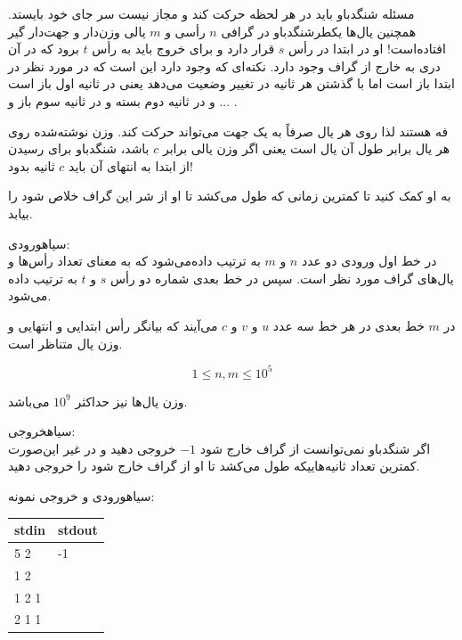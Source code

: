 


‌مسئله
شنگدباو باید در هر لحظه حرکت کند و مجاز نیست سر جای خود بایستد. همچنین یال‌ها یکطرشنگدباو در گرافی $n$ رأسی و $m$ یالی وزن‌دار و جهت‌دار گیر افتاده‌است! او در ابتدا در رأس $s$ قرار دارد و برای خروج باید به رأس $t$ برود که در آن دری به خارج از گراف وجود دارد. نکته‌ای که وجود دارد این است که در مورد نظر در ابتدا باز است اما با گذشتن هر ثانیه در تغییر وضعیت می‌دهد یعنی در ثانیه اول باز است و در ثانیه دوم بسته و در ثانیه سوم باز و ... .

فه هستند لذا روی هر یال صرفاً به یک جهت می‌تواند حرکت کند. وزن نوشته‌شده روی هر یال برابر طول آن یال است یعنی اگر وزن یالی برابر $c$ باشد، شنگدباو برای رسیدن از ابتدا به انتهای آن باید $c$ ثانیه بدود!

به او کمک کنید تا کمترین زمانی که طول می‌کشد تا او از شر این گراف خلاص شود را بیابد.

‌سیاه{ورودی:}\\
در خط اول ورودی دو عدد $n$ و $m$ به ترتیب داده‌می‌شود که به معنای تعداد رأس‌ها و یال‌های گراف مورد نظر است. سپس در خط بعدی شماره دو رأس $s$ و $t$ به ترتیب داده می‌شود.

در $m$ خط بعدی در هر خط سه عدد $u$ و $v$ و $c$ می‌آیند که بیانگر رأس ابتدایی و انتهایی و وزن یال متناظر است.

$$1 \le n, m \le 10^5$$

وزن یال‌ها نیز حداکثر $10^9$ می‌باشد.

‌سیاه{خروجی:}\\
اگر شنگدباو نمی‌توانست از گراف خارج شود $-1$ خروجی دهید و در غیر این‌صورت کمترین تعداد ثانیه‌هاییکه طول می‌کشد تا او از گراف خارج شود را خروجی دهید.

‌سیاه{ورودی و خروجی نمونه:}\\

\begin{latin}
	\begin{tabularx}{\textwidth}{|X | X|}
		\hline
		\textbf{stdin} &
		\textbf{stdout}\\
		\hline
		5 2& -1\\
		1 2&\\
		1 2 1&\\
		2 1 1&\\
		\hline
	\end{tabularx}
\end{latin}

